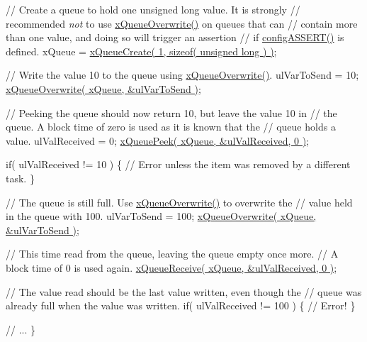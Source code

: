 \begin{DoxyPre}    // Create a queue to hold one unsigned long value.  It is strongly
    // recommended {\itshape not} to use \hyperlink{queue_8h_a8e9ced123b5a0e37a36d3bbdb2e56b4e}{xQueueOverwrite()} on queues that can
    // contain more than one value, and doing so will trigger an assertion
    // if \hyperlink{FreeRTOS_8h_a228c70cd48927d6ab730ed1a6dfbe35f}{configASSERT()} is defined.
    xQueue = \hyperlink{queue_8h_aeb858b824bd74a934ea7ebb81af2a6bb}{xQueueCreate( 1, sizeof( unsigned long ) )};\end{DoxyPre}



\begin{DoxyPre}    // Write the value 10 to the queue using \hyperlink{queue_8h_a8e9ced123b5a0e37a36d3bbdb2e56b4e}{xQueueOverwrite()}.
    ulVarToSend = 10;
    \hyperlink{queue_8h_a8e9ced123b5a0e37a36d3bbdb2e56b4e}{xQueueOverwrite( xQueue, &ulVarToSend )};\end{DoxyPre}



\begin{DoxyPre}    // Peeking the queue should now return 10, but leave the value 10 in
    // the queue.  A block time of zero is used as it is known that the
    // queue holds a value.
    ulValReceived = 0;
    \hyperlink{queue_8h_a2df70733bb875477cd9614c5b3446257}{xQueuePeek( xQueue, &ulValReceived, 0 )};\end{DoxyPre}



\begin{DoxyPre}    if( ulValReceived != 10 )
    \{
        // Error unless the item was removed by a different task.
    \}\end{DoxyPre}



\begin{DoxyPre}    // The queue is still full.  Use \hyperlink{queue_8h_a8e9ced123b5a0e37a36d3bbdb2e56b4e}{xQueueOverwrite()} to overwrite the
    // value held in the queue with 100.
    ulVarToSend = 100;
    \hyperlink{queue_8h_a8e9ced123b5a0e37a36d3bbdb2e56b4e}{xQueueOverwrite( xQueue, &ulVarToSend )};\end{DoxyPre}



\begin{DoxyPre}    // This time read from the queue, leaving the queue empty once more.
    // A block time of 0 is used again.
    \hyperlink{queue_8h_af1549eac0e7f05694a59a0b967c80be3}{xQueueReceive( xQueue, &ulValReceived, 0 )};\end{DoxyPre}



\begin{DoxyPre}    // The value read should be the last value written, even though the
    // queue was already full when the value was written.
    if( ulValReceived != 100 )
    \{
        // Error!
    \}\end{DoxyPre}



\begin{DoxyPre}    // ...
\}
 \end{DoxyPre}
 